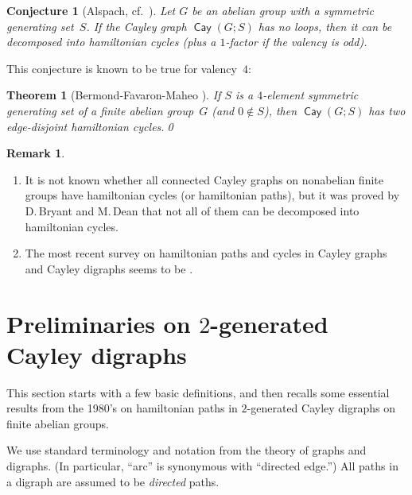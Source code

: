 \documentclass[11pt]{amsart}
\newtheorem{thm}[equation]{Theorem}
\newtheorem{conj}[equation]{Conjecture}
\theoremstyle{definition}
\newtheorem{remark}[equation]{Remark}
\numberwithin{case}{startcases}
\numberwithin{equation}{section}
\newcommand{\cay}{\mathop{\mathsf{Cay}}}
\begin{document}
	\begin{conj}[Alspach, cf.\ {\cite[Unsolved Problem~4.5, p.~454]{alspach1985}}]\label{alspach}
		Let $G$ be an abelian group with a symmetric generating set~$S$.
		If the Cayley graph\/ $\cay(G; S)$ has no loops, then it can be decomposed into hamiltonian cycles \textup(plus a $1$-factor if the valency is odd\textup). 
	\end{conj}
	
	This conjecture is known to be true for valency~$4$:
	
	\begin{thm}[Bermond-Favaron-Maheo  \cite{bermond1989hamiltonian}]
		If $S$ is a $4$-element symmetric generating set of a finite abelian group~$G$ \textup(and $0 \notin S$\textup), then $\cay(G; S)$ has two edge-disjoint hamiltonian cycles.\qed
	\end{thm}
	
	\begin{remark}
		\leavevmode
		\begin{enumerate}
			\item It is not known whether all connected Cayley graphs on nonabelian finite groups have hamiltonian cycles (or hamiltonian paths), but it was proved by D.\,Bryant and M.\,Dean \cite{BryantDean} that not all of them can be decomposed into hamiltonian cycles.
			\item The most recent survey on hamiltonian paths and cycles in Cayley graphs and Cayley digraphs seems to be \cite{Lanel}.
		\end{enumerate}
	\end{remark}
	
	
	
	
	
	
	
	\section{Preliminaries on \texorpdfstring{$2$}{2}-generated Cayley digraphs}\label{def}
	
	This section starts with a few basic definitions, and then recalls some essential results from the 1980's on  hamiltonian paths in $2$-generated Cayley digraphs on finite abelian groups. 
	
	We use standard terminology and notation from the theory of graphs and digraphs. (In particular, ``arc'' is synonymous with ``directed edge\rlap.'') All paths in a digraph are assumed to be \emph{directed} paths.
	
\end{document}
